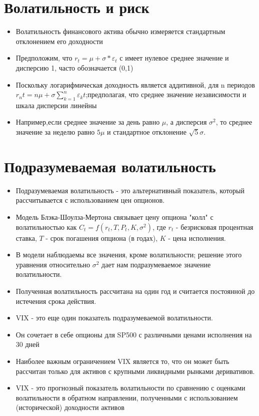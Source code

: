 \documentclass{article}
\begin{document}
\section{Волатильность и риск}
\begin{itemize}
  \item Волатильность финансового актива обычно измеряется стандартным отклонением его доходности
  \item Предположим, что \(r_t = \mu + \sigma*\varepsilon_t \) с  имеет нулевое среднее значение и дисперсию 1, часто обозначается \N(0,1)
  \item Поскольку логарифмическая доходность является аддитивной, для n периодов \(r_nt = n\mu + \sigma\sum_{k=1}^{n}\varepsilon_kt\);предполагая, что среднее значение независимости и шкала дисперсии линейны
  \item Например,если среднее значение за день равно \(\mu\), а дисперсия \(\sigma^2\), то среднее значение за неделю равно \(5\mu\) и стандартное отклонение \(\sqrt{5}\sigma\).
\end{itemize}

\section{Подразумеваемая волатильность}
\begin{itemize}
  \item Подразумеваемая волатильность - это альтернативный показатель, который рассчитывается с использованием цен опционов.
  \item Модель Блэка-Шоулза-Мертона связывает цену опциона "колл" с волатильностью как \(C_t = f(r_t, T, P_t, K, \sigma^2)\), где \(r_t\) - безрисковая процентная ставка, $T$ - срок погашения опциона (в годах), $K$ - цена исполнения.
  \item В модели наблюдаемы все значения, кроме волатильности; решение этого уравнения относительно \(\sigma^2\) дает нам подразумеваемое значение волатильности.
  \item Полученная волатильность рассчитана на один год и считается постоянной до истечения срока действия.
  \item VIX - это еще один показатель подразумеваемой волатильности.
  \item Он сочетает в себе опционы для SP500 с различными ценами исполнения на 30 дней
  \item Наиболее важным ограничением VIX является то, что он может быть рассчитан только для активов с крупными ликвидными рынками деривативов.
\item VIX - это прогнозный показатель волатильности по сравнению с оценками волатильности в обратном направлении, полученными с использованием (исторической) доходности активов
\end{itemize}
\end{document}
